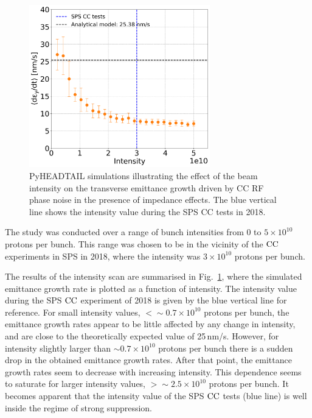 \begin{figure}[!h] 
    \centering         
    \includegraphics[width=0.7\textwidth]{images/Ch7/sps_270GeV_PN1e-8_400MHz_QpxQpy5e-1_ayy6000_intensity_spsCCtests.png}
        \caption{PyHEADTAIL simulations illustrating the effect of the beam intensity on the transverse emittance growth driven by CC RF phase noise in the presence of impedance effects. The blue vertical line shows the intensity value during the SPS CC tests in 2018.}
        \label{fig:study_8_intensity_scan}
 \end{figure}

 The study was conducted over a range of bunch intensities from 0 to $5 \times 10^{10}$ protons per bunch. This range was chosen to be in the vicinity of the ${\mathrm{CC}}$ experiments in SPS in 2018, where the intensity was $3 \times 10^{10}$ protons per bunch. %

 The results of the intensity scan are summarised in Fig.~\ref{fig:study_8_intensity_scan}, where the simulated emittance growth rate is plotted as a function of intensity. The intensity value during the SPS ${\mathrm{CC}}$ experiment of 2018 is given by the blue vertical line for reference. For small intensity values, $< \sim 0.7\times 10^{10}$ protons per bunch, the emittance growth rates appear to be little affected by any change in intensity, and are close to the theoretically expected value of 25\,nm/s. However, for intensity slightly larger than $\sim 0.7 \times 10^{10}$ protons per bunch there is a sudden drop in the obtained emittance growth rates. After that point, the emittance growth rates seem to decrease with increasing intensity. This dependence seems to saturate for larger intensity values, $>\sim 2.5 \times 10^{10}$ protons per bunch. It becomes apparent that the intensity value of the SPS ${\mathrm{CC}}$ tests (blue line) is well inside the regime of strong suppression.

